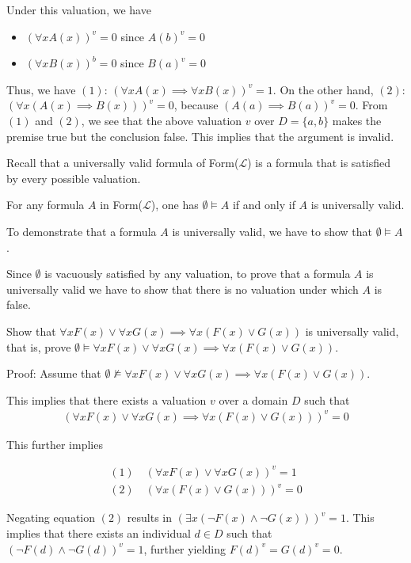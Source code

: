 \documentclass{article}
\begin{document}
Under this valuation, we have
\begin{itemize}
    \item $(\forall x A(x))^v = 0$ since $A(b)^v = 0$
    \item $(\forall x B(x))^b = 0$ since $B(a)^v = 0$
\end{itemize}

Thus, we have $(1)$: $(\forall x A(x) \implies \forall x B(x))^v = 1$. On the other hand, $(2)$: $(\forall x (A(x) \implies B(x)))^v = 0$, because $(A(a) \implies B(a))^v = 0$. From $(1)$ and $(2)$, we see that the above valuation $v$ over $D = \{a,b\}$ makes the premise true but the conclusion false. This implies that the argument is invalid.

Recall that a universally valid formula of Form($\mathcal{L}$) is a formula that is satisfied by every possible valuation.

For any formula $A$ in Form($\mathcal{L}$), one has $\emptyset \vDash A$ if and only if $A$ is universally valid.

To demonstrate that a formula $A$ is universally valid, we have to show that $\emptyset \vDash A$.

Since $\emptyset$ is vacuously satisfied by any valuation, to prove that a formula $A$ is universally valid we have to show that there is no valuation under which $A$ is false.

Show that $\forall x F(x) \vee \forall x G(x) \implies \forall x (F(x) \vee G(x))$ is universally valid, that is, prove $\emptyset \vDash \forall x F(x) \vee \forall x G(x) \implies \forall x (F(x) \vee G(x))$. 

Proof: Assume that $\emptyset \not\vDash \forall x F(x) \vee \forall x G(x) \implies \forall x (F(x) \vee G(x))$.

This implies that there exists a valuation $v$ over a domain $D$ such that
\begin{align*}
(\forall x F(x) \vee \forall x G(x) \implies \forall x (F(x) \vee G(x)))^v = 0
\end{align*}

This further implies 

\begin{align*}
(1) \quad (\forall x F(x) \vee \forall x G(x))^v = 1 \\
(2) \quad (\forall x (F(x) \vee G(x)))^v = 0
\end{align*}

Negating equation $(2)$ results in $(\exists x (\neg F(x) \wedge \neg G(x)))^v = 1$. This implies that there exists an individual $d \in D$ such that $(\neg F(d) \wedge \neg G(d))^v = 1$, further yielding $F(d)^v = G(d)^v = 0$.
\end{document}
